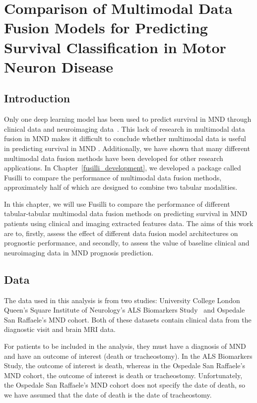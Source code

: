 \chapter{Comparison of Multimodal Data Fusion Models for Predicting Survival Classification in Motor Neuron Disease}
\label{fusilli_on_mnd}

\section{Introduction}
Only one deep learning model has been used to predict survival in MND through clinical data and neuroimaging data~\cite{vanderburghDeepLearningPredictions2017}.
This lack of research in multimodal data fusion in MND makes it difficult to conclude whether multimodal data is useful in predicting survival in MND .
Additionally, we have shown that many different multimodal data fusion methods have been developed for other research applications.
In Chapter~\ref{fusilli_development}, we developed a package called Fusilli to compare the performance of multimodal data fusion methods, approximately half of which are designed to combine two tabular modalities.

In this chapter, we will use Fusilli to compare the performance of different tabular-tabular multimodal data fusion methods on predicting survival in MND patients using clinical and imaging extracted features data.
The aims of this work are to, firstly, assess the effect of different data fusion model architectures on prognostic performance, and secondly, to assess the value of baseline clinical and neuroimaging data in MND prognosis prediction.

\section{Data}

The data used in this analysis is from two studies: University College London Queen's Square Institute of Neurology's ALS Biomarkers Study~\cite{UKMNDCSG} and Ospedale San Raffaele's MND cohort.
Both of these datasets contain clinical data from the diagnostic visit and brain MRI data.

For patients to be included in the analysis, they must have a diagnosis of MND and have an outcome of interest (death or tracheostomy).
In the ALS Biomarkers Study, the outcome of interest is death, whereas in the Ospedale San Raffaele's MND cohort, the outcome of interest is death or tracheostomy.
Unfortunately, the Ospedale San Raffaele's MND cohort does not specify the date of death, so we have assumed that the date of death is the date of tracheostomy.

